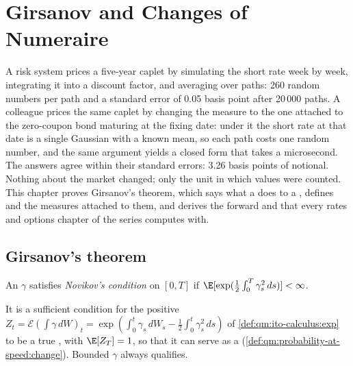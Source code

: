 \chapter{Girsanov and Changes of Numeraire}\label{ch:qm:girsanov-and-changes-of-numeraire}

A risk system prices a five-year caplet by simulating the short rate week by week, integrating
it into a discount factor, and averaging over paths: 260 random numbers per path and a
standard error of 0.05 basis point after 20\,000 paths. A colleague prices the same caplet by
changing the measure to the one attached to the zero-coupon bond maturing at the fixing date:
under it the short rate at that date is a single Gaussian with a known mean, so each path costs
one random number, and the same argument yields a closed form that takes a microsecond. The
answers agree within their standard errors: 3.26 basis points of notional. Nothing about the
market changed; only the unit in which values were counted. This chapter proves Girsanov's
theorem, which says what a  does to a , defines  and
the  measures attached to them, and derives the forward and  that
every rates and options chapter of the series computes with.

\section{Girsanov's theorem}

\begin{definition}\label{def:qm:girsanov-and-changes-of-numeraire:novikov}
An  $\gamma$ satisfies \emph{Novikov's condition} on $[0,
T]$ if $\E[\exp(\tfrac12\int_0^T\gamma_s^2\,ds)] < \infty$.
\end{definition}

It is a sufficient condition for the positive  $Z_t = \mathcal E(\int\gamma\,dW)_t =
\exp(\int_0^t\gamma_s\,dW_s - \tfrac12\int_0^t\gamma_s^2\,ds)$ of \cref{def:qm:ito-calculus:exp} to be a true
, with $\E[Z_T] = 1$, so that it can serve as a 
(\cref{def:qm:probability-at-speed:change}). Bounded $\gamma$ always qualifies.

